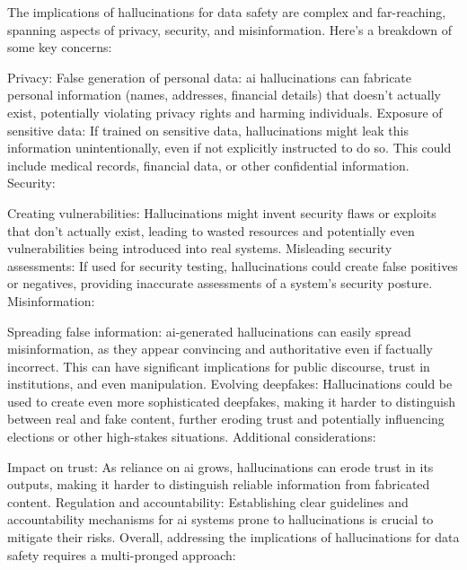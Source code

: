 \begin{aibox}%
  The implications of hallucinations for data safety are complex and far-reaching, spanning aspects of privacy, security, and misinformation. Here's a breakdown of some key concerns:

Privacy: False generation of personal data: \gls{ai} hallucinations can fabricate personal \gls{information} (names, addresses, financial details) that doesn't actually exist, potentially violating privacy rights and harming individuals.
Exposure of sensitive data: If trained on sensitive data, hallucinations might leak this \gls{information} unintentionally, even if not explicitly instructed to do so. This could include medical records, financial data, or other confidential \gls{information}.
Security:

Creating vulnerabilities: Hallucinations might invent security flaws or exploits that don't actually exist, leading to wasted resources and potentially even vulnerabilities being introduced into real systems.
Misleading security assessments: If used for security testing, hallucinations could create false positives or negatives, providing inaccurate assessments of a system's security posture.
Misinformation:

Spreading false \gls{information}: \gls{ai}-generated hallucinations can easily spread misinformation, as they appear convincing and authoritative even if factually incorrect. This can have significant implications for public discourse, trust in institutions, and even manipulation.
Evolving deepfakes: Hallucinations could be used to create even more sophisticated deepfakes, making it harder to distinguish between real and fake content, further eroding trust and potentially influencing elections or other high-stakes situations.
Additional considerations:

Impact on trust: As reliance on \gls{ai} grows, hallucinations can erode trust in its outputs, making it harder to distinguish reliable \gls{information} from fabricated content.
Regulation and accountability: Establishing clear guidelines and accountability mechanisms for \gls{ai} systems prone to hallucinations is crucial to mitigate their risks.
Overall, addressing the implications of hallucinations for data safety requires a multi-pronged approach:


\end{aibox}
